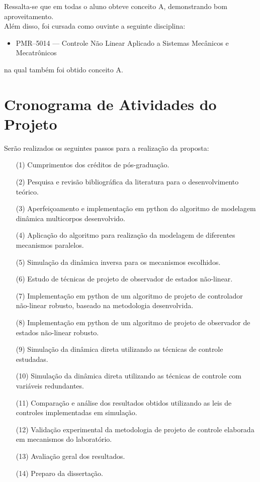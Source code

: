 \documentclass[a4paper,11pt,brazil,fleqn]{article}
\begin{document}
Ressalta-se que em todas o aluno obteve conceito A, demonstrando bom aproveitamento. \\

Al\'em disso, foi cursada como ouvinte a seguinte disciplina:
\begin{itemize}
\item PMR--5014 --- Controle N\~ao Linear Aplicado a Sistemas Mec\^anicos e Mecatr\^onicos	
\end{itemize}

na qual tamb\'em foi obtido conceito A.

\section{Cronograma de Atividades do Projeto}\label{S07}

Ser\~ao realizados os seguintes passos para a realiza\c{c}\~ao da proposta:

\begin{itemize}
\item[(1)] 	Cumprimentos dos cr\'editos de p\'os-gradua\c{c}\~ao.
\item[(2)] 	Pesquisa e revis\~ao bibliogr\'afica da literatura para o desenvolvimento te\'orico.
\item[(3)]  Aperfei\c{c}oamento e implementa\c{c}\~ao em python do algoritmo de modelagem din\^amica multicorpos desenvolvido.
\item[(4)] 	Aplica\c{c}\~ao do algoritmo para realiza\c{c}\~ao da modelagem de diferentes mecanismos paralelos.
\item[(5)] 	Simula\c{c}\~ao da din\^amica inversa para os mecanismos escolhidos.
\item[(6)]  Estudo de t\'ecnicas de projeto de observador de estados n\~ao-linear.
\item[(7)]  Implementa\c{c}\~ao em python de um algoritmo de projeto de controlador n\~ao-linear robusto, baseado na metodologia desenvolvida.
\item[(8)]  Implementa\c{c}\~ao em python de um algoritmo de projeto de observador de estados n\~ao-linear robusto.
\item[(9)] Simula\c{c}\~ao da din\^amica direta utilizando as t\'ecnicas de controle estudadas.
\item[(10)] Simula\c{c}\~ao da din\^amica direta utilizando as t\'ecnicas de controle com vari\'aveis redundantes.
\item[(11)] 	Compara\c{c}\~ao e an\'alise dos resultados obtidos utilizando as leis de controles implementadas em simula\c{c}\~ao.
\item[(12)] 	Valida\c{c}\~ao experimental da metodologia de projeto de controle elaborada em mecanismos do laborat\'orio.
\item[(13)] 	Avalia\c{c}\~ao geral dos resultados.
\item[(14)] Preparo da disserta\c{c}\~ao.
\end{itemize}
\end{document}
